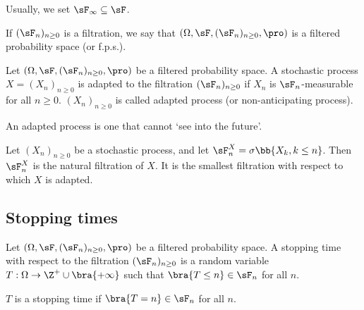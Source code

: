 \begin{remark}
Usually, we set $\sF_\infty\subseteq \sF$.%
\end{remark}

\begin{definition}
If $(\sF_n)_{n\geq 0}$ is a filtration, we say that $(\Omega,\sF, (\sF_n)_{n\geq 0},\pro)$ is a filtered probability space (or f.p.s.).
\end{definition}

\begin{definition}\label{def:adapted_process_discrete}
Let $(\Omega,\sF, (\sF_n)_{n\geq 0},\pro)$ be a filtered probability space. A stochastic process $X = (X_n)_{n\geq 0}$ is adapted to the filtration $(\sF_n)_{n \geq 0}$ if $X_n$ is $\sF_n$-measurable for all $n\geq 0$. $(X_n)_{n\geq 0}$ is called adapted process (or non-anticipating process).
\end{definition}

\begin{remark}
An adapted process is one that cannot `see into the future'.
\end{remark}

\begin{definition}
Let $(X_n)_{n\geq 0}$ be a stochastic process, and let $\sF^X_n = \sigma\bb{X_k, k \leq n}$. Then $\sF^X_n$ is the natural filtration of $X$. It is the smallest filtration with respect to which $X$ is adapted.
\end{definition}

\subsection{Stopping times}

\begin{definition}
Let $(\Omega,\sF, (\sF_n)_{n\geq 0},\pro)$ be a filtered probability space. A stopping time with respect to the filtration $(\sF_n)_{n\geq 0}$ is a random variable $T:\Omega \to \Z^+\cup \bra{+\infty}$ such that $\bra{T \leq n} \in \sF_n$ for all $n$.
\end{definition}

\begin{proposition}\label{pro:stopping_time_equal}
$T$ is a stopping time if $\bra{T=n} \in \sF_n$ for all $n$.
\end{proposition}

